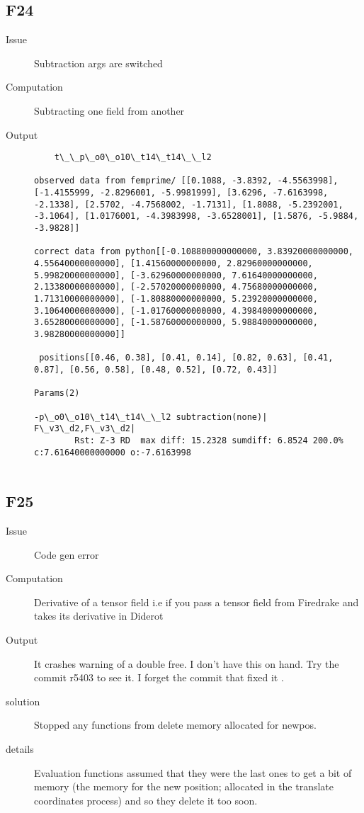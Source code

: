 \subsection{F24}

\begin{description}
\item[Issue] Subtraction args are switched
\item[Computation] Subtracting one field from another
\item[Output]
  \begin{lstlisting}
    t\_\_p\_o0\_o10\_t14\_t14\_\_l2

observed data from femprime/ [[0.1088, -3.8392, -4.5563998], [-1.4155999, -2.8296001, -5.9981999], [3.6296, -7.6163998, -2.1338], [2.5702, -4.7568002, -1.7131], [1.8088, -5.2392001, -3.1064], [1.0176001, -4.3983998, -3.6528001], [1.5876, -5.9884, -3.9828]]

correct data from python[[-0.108800000000000, 3.83920000000000, 4.55640000000000], [1.41560000000000, 2.82960000000000, 5.99820000000000], [-3.62960000000000, 7.61640000000000, 2.13380000000000], [-2.57020000000000, 4.75680000000000, 1.71310000000000], [-1.80880000000000, 5.23920000000000, 3.10640000000000], [-1.01760000000000, 4.39840000000000, 3.65280000000000], [-1.58760000000000, 5.98840000000000, 3.98280000000000]]

 positions[[0.46, 0.38], [0.41, 0.14], [0.82, 0.63], [0.41, 0.87], [0.56, 0.58], [0.48, 0.52], [0.72, 0.43]]

Params(2)

-p\_o0\_o10\_t14\_t14\_\_l2 subtraction(none)| F\_v3\_d2,F\_v3\_d2| 
		Rst: Z-3 RD  max diff: 15.2328 sumdiff: 6.8524 200.0% c:7.61640000000000 o:-7.6163998


  \end{lstlisting}
\end{description}

\subsection{F25}

\begin{description}
\item[Issue] Code gen error
\item[Computation] Derivative of a tensor field i.e if you pass a tensor field from Firedrake and takes its derivative in Diderot
\item[Output]  It crashes warning of a double free. I don't have this on hand. Try the commit r5403 to see it. I forget the commit that fixed it
.\item[solution] Stopped any functions from delete memory allocated for newpos.
\item[details] Evaluation functions assumed that they were the last ones to get a bit of memory (the memory for the new position; allocated in the translate coordinates process) and so they delete it too soon.

\end{description}

